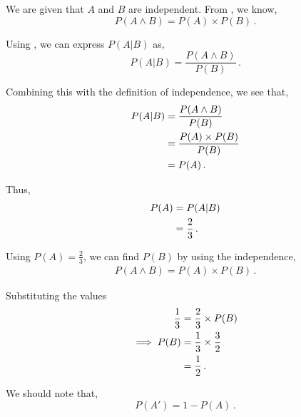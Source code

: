 \begin{subquestions}
\subquestion

\begin{subsubquestions}
	
\subsubquestion
	
We are given that $A$ and $B$ are independent. From , we know,
\begin{equation}
	P(A \land B) = P (A) \times P(B) \,.
\end{equation}

Using , we can express $P(A|B)$ as,
\begin{equation}
P(A|B) = \frac{P(A \land B)}{P(B)} \,.
\end{equation}

Combining this with the definition of independence, we see that,
\begin{align}
	P(A|B) &=  \frac{P(A \land B)}{P(B)} \nonumber\\
	&= \frac{P(A) \times P(B)}{P(B)} \nonumber\\
	&= P(A) \,.
\end{align}

Thus, 
\begin{align}
	P(A) &= P(A|B) \nonumber\\
		  &= \frac{2}{3}\,.
\end{align}
	

\subsubquestion

Using $P(A)=\frac{2}{3}$, we can find $P(B)$ by using the independence,
\begin{align}
	P(A \land B) = P (A) \times P(B)  \,.
\end{align}

Substituting the values
\begin{align}
\frac{1}{3} &= \frac{2}{3} \times P(B) \nonumber \\
	                \implies P(B) & = \frac{1}{3} \times \frac{3}{2} \nonumber \\
	                              & = \frac{1}{2} \,.
\end{align}


\subsubquestion

We should note that,
\begin{equation}
	P(A') = 1 - P(A) \,.
\end{equation}


\end{subsubquestions}
\end{subquestions}
